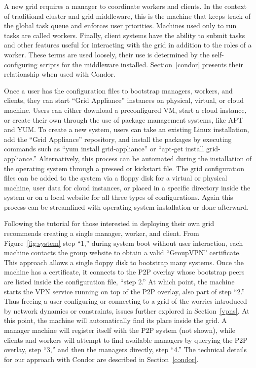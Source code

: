 \documentclass[conference]{IEEEtran}
\begin{document}
A new grid requires a manager to coordinate workers and clients.  In the
context of traditional cluster and grid middleware, this is the machine that
keeps track of the global task queue and enforces user priorities.  Machines
used only to run tasks are called workers.  Finally, client systems have the
ability to submit tasks and other features useful for interacting with the grid
in addition to the roles of a worker.  These terms are used loosely, their use
is determined by the self-configuring scripts for the middleware installed.
Section~\ref{condor} presents their relationship when used with Condor.

Once a user has the configuration files to bootstrap managers, workers, and
clients, they can start ``Grid Appliance'' instances  on physical, virtual, or
cloud machine.  Users can either download a preconfigured VM, start a cloud
instance, or create their own through the use of package management systems,
like APT and YUM.  To create a new system, users can take an existing Linux
installation, add the ``Grid Appliance'' repository, and install the packages
by executing commands such as ``yum install grid-appliance'' or ``apt-get
install grid-appliance.'' Alternatively, this process can be automated during
the installation of the operating system through a preseed or kickstart file.
The grid configuration files can be added to the system via a floppy disk for a
virtual or physical machine, user data for cloud instances, or placed in a
specific directory inside the system or on a local website for all three types
of configurations.  Again this process can be streamlined with operating system
installation or done afterward.  
 
Following the tutorial for those interested in deploying their own grid
recommends creating a single manager, worker, and client.  From
Figure~\ref{fig:system} step ``1,'' during system boot without user
interaction, each machine contacts the group website to obtain a valid
``GroupVPN'' certificate.  This approach allows a single floppy disk to
bootstrap many systems.  Once the machine has a certificate, it connects to the
P2P overlay whose bootstrap peers are listed inside the configuration file,
``step 2.''  At which point, the machine starts the VPN service running on top
of the P2P overlay, also part of step ``2.'' Thus freeing a user configuring or
connecting to a grid of the worries introduced by network dynamics or
constraints, issues further explored in Section~\ref{vpns}.  At this point, the
machine will automatically find its place inside the grid.  A manager machine
will register itself with the P2P system (not shown), while clients and workers
will attempt to find available managers by querying the P2P overlay, step
``3,'' and then the managers directly, step ``4.''  The technical details for
our approach with Condor are described in Section~\ref{condor}.
\end{document}

